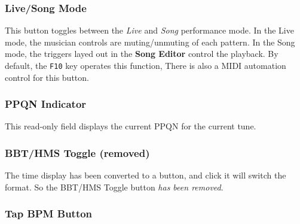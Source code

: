\subsubsection{Live/Song Mode}
\label{subsubsec:introduction_livesong_mode_button}

   This button toggles between the \textsl{Live} and \textsl{Song} performance
   mode. In the Live mode, the musician controls are muting/unmuting of each
   pattern.  In the Song mode, the triggers layed out in the
   \textbf{Song Editor} control the playback.
   By default, the \texttt{F10} key operates this function,
   There is also a MIDI automation control for this button.

\begin{comment}
   \itempar{Toggle Tracks}{pattern!toggle tracks}
   \index{pattern!toggle tracks}
   This button changes the status of all of the
   \textsl{playing} tracks, reversing the
   mute status of each pattern that is playing.
   The next click will then unmute only those tracks.
   Because it can be confusing, this button is disabled (not shown
   in the figure) in Song mode.

   LATER:  Describe
   \texttt{Ctrl-M},
   \texttt{Ctrl-U}, and
   \texttt{Ctrl-T}.

\end{comment}

\subsubsection{PPQN Indicator}
\label{subsubsec:introduction_ppqn_indicator}

   This read-only field displays the current PPQN for the current tune.


\subsubsection{BBT/HMS Toggle (removed)}
\label{subsubsec:introduction_time_format_toggle_button}

   The time display has been converted to a button, and click it will
   switch the format. So the BBT/HMS Toggle button
   \textsl{has been removed}.


\subsubsection{Tap BPM Button}
\label{subsubsec:introduction_tap_bpm_button}

